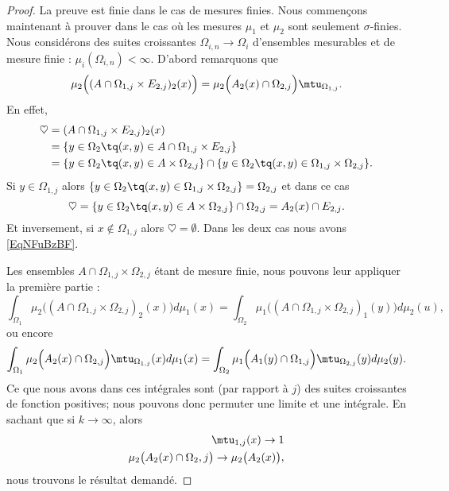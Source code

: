 \begin{proof}
    La preuve est finie dans le cas de mesures finies. Nous commençons maintenant à prouver dans le cas où les mesures \( \mu_1\) et \( \mu_2\) sont seulement \( \sigma\)-finies. Nous considérons des suites croissantes \( \Omega_{i,n}\to\Omega_i\) d'ensembles mesurables et de mesure finie : \( \mu_i(\Omega_{i,n})<\infty\). D'abord remarquons que
    \begin{equation}\label{EqNFuBzBF}
        \mu_2\Big( (A\cap \Omega_{1,j}\times E_{2,j})_2(x) \Big)=\mu_2\Big( A_2(x)\cap \Omega_{2,j} \Big)\mtu_{\Omega_{1,j}}.
    \end{equation}
    En effet,
    \begin{subequations}
        \begin{align}
            \heartsuit&=(A\cap\Omega_{1,j}\times E_{2,j})_2(x)\\
            &=\{ y\in\Omega_2\tq (x,y)\in A\cap \Omega_{1,j}\times E_{2,j} \}\\
            &=\{ y\in \Omega_2\tq (x,y)\in A\times \Omega_{2,j} \}\cap\{ y\in\Omega_2\tq (x,y)\in \Omega_{1,j}\times \Omega_{2,j} \}.
        \end{align}
    \end{subequations}
    Si \( y\in \Omega_{1,j}\) alors \( \{ y\in \Omega_2\tq (x,y)\in \Omega_{1,j}\times \Omega_{2,j} \}=\Omega_{2,j}\) et dans ce cas
    \begin{equation}
        \heartsuit=\{ y\in \Omega_2\tq (x,y)\in A\times \Omega_{2,j} \}\cap \Omega_{2,j}=A_2(x)\cap E_{2,j}.
    \end{equation}
    Et inversement, si \( x\notin \Omega_{1,j}\) alors \( \heartsuit=\emptyset\). Dans les deux cas nous avons \eqref{EqNFuBzBF}.

    Les ensembles \( A\cap \Omega_{1,j}\times \Omega_{2,j}\) étant de mesure finie, nous pouvons leur appliquer la première partie :
    \begin{equation}
        \int_{\Omega_1}\mu_2\Big( (A\cap\Omega_{1,j}\times \Omega_{2,j})_2(x) \Big)d\mu_1(x)=\int_{\Omega_2}\mu_1\Big( (A\cap\Omega_{1,j}\times \Omega_{2,j})_1(y) \Big)d\mu_2(u),
    \end{equation}
    ou encore
    \begin{equation}
        \int_{\Omega_1}\mu_2\Big( A_2(x)\cap \Omega_{2,j} \Big)\mtu_{\Omega_{1,j}}(x)d\mu_1(x)=\int_{\Omega_2}\mu_1\Big( A_1(y)\cap \Omega_{1,j} \Big)\mtu_{\Omega_{2,j}}(y)d\mu_2(y).
    \end{equation}
    Ce que nous avons dans ces intégrales sont (par rapport à \( j\)) des suites croissantes de fonction positives; nous pouvons donc permuter une limite et une intégrale. En sachant que si \( k\to \infty\), alors
    \begin{subequations}
        \begin{align}
            \mtu_{1,j}(x)\to 1\\
            \mu_2\big( A_2(x)\cap \Omega_2,j \big)\to\mu_2\big( A_2(x) \big),
        \end{align}
    \end{subequations}
    nous trouvons le résultat demandé.
\end{proof}


